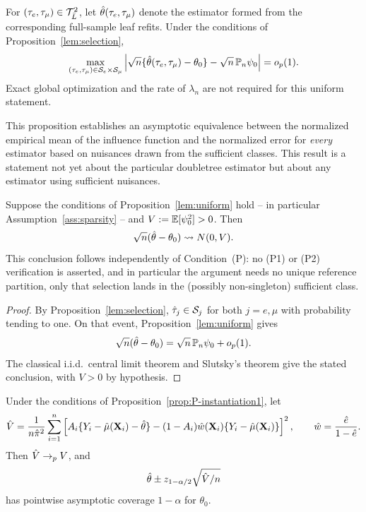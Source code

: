 \documentclass[12pt]{article}
\begin{document}
\begin{proposition}
\label{lem:uniform}
For $(\tau_e,\tau_\mu)\in\mathcal{T}_{\bar{L}}^2$, let
$\hat{\theta}(\tau_e,\tau_\mu)$ denote the estimator formed from the corresponding
full-sample leaf refits. Under the conditions of Proposition~\ref{lem:selection},
\[
  \max_{(\tau_e,\tau_\mu)\in\mathcal{S}_e\times\mathcal{S}_\mu}
  \left|
    \sqrt n\{\hat{\theta}(\tau_e,\tau_\mu)-\theta_0\}
    -
    \sqrt n\,\mathbb{P}_n\psi_0
  \right|
  =o_p(1).
\]
Exact global optimization and the rate of $\lambda_n$ are not required for
this uniform statement.
\end{proposition}

This proposition establishes an asymptotic equivalence between the normalized empirical mean of the influence function and the normalized error for \emph{every} estimator based on nuisances drawn from the sufficient classes. This result is a statement not yet about the particular doubletree estimator but about any estimator using sufficient nuisances.

\begin{proposition}
\label{prop:P-instantiation1}
Suppose the conditions of Proposition~\ref{lem:uniform} hold -- in
particular Assumption~\ref{ass:sparsity} -- and $V:=\mathbb{E}[\psi_0^2]>0$. Then
\[
  \sqrt n(\hat{\theta}-\theta_0)\rightsquigarrow N(0,V).
\]
This conclusion follows independently of Condition~(P): no (P1) or (P2)
verification is asserted, and in particular the argument needs no unique
reference partition, only that selection lands in the (possibly
non-singleton) sufficient class.
\end{proposition}

\begin{proof}
By Proposition~\ref{lem:selection}, $\hat{\tau}_j\in\mathcal{S}_j$ for both $j=e,\mu$
with probability tending to one. On that event, Proposition~\ref{lem:uniform}
gives
\[
  \sqrt n(\hat{\theta}-\theta_0)
  =
  \sqrt n\,\mathbb{P}_n\psi_0+o_p(1).
\]
The classical i.i.d.\ central limit theorem and Slutsky's theorem give the
stated conclusion, with
$V>0$ by hypothesis.
\end{proof}

\begin{corollary}
\label{cor:variance}
Under the conditions of Proposition~\ref{prop:P-instantiation1}, let
\[
  \hat{V}
  =
  \frac{1}{n\hat{\pi}^2}
  \sum_{i=1}^n
  \left[
    A_i\{Y_i-\hat\mu(\mathbf{X}_i)-\hat{\theta}\}
    -
    (1-A_i)\hat w(\mathbf{X}_i)\{Y_i-\hat\mu(\mathbf{X}_i)\}
  \right]^2,
  \qquad
  \hat w=\frac{\hat e}{1-\hat e}.
\]
Then $\hat{V}\to_p V$, and
\[
  \hat{\theta}
  \pm
  z_{1-\alpha/2}\sqrt{\hat{V}/n}
\]
has pointwise asymptotic coverage $1-\alpha$ for $\theta_0$.
\end{corollary}
\end{document}
